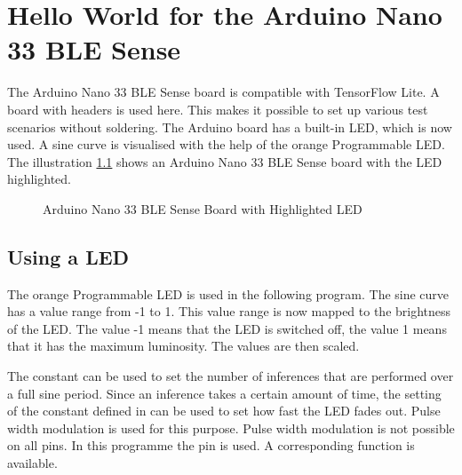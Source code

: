 %
%
%
%



\chapter{Hello World for the Arduino Nano 33 BLE Sense}

The Arduino Nano 33 BLE Sense board is compatible with TensorFlow Lite. A board with headers is used here. This makes it possible to set up various test scenarios without soldering. The Arduino board has a built-in LED, which is now used. A sine curve is visualised with the help of the orange Programmable LED. The illustration \ref{fig:NanoLED} shows an Arduino Nano 33 BLE Sense board with the LED highlighted.

\begin{figure}
  \centering
  
  \caption{Arduino Nano 33 BLE Sense Board with Highlighted LED}\label{fig:NanoLED}
\end{figure}


 \section{Using a LED}
 
 The orange Programmable LED is used in the following program. The sine curve has a value range from -1 to 1. This value range is now mapped to the brightness of the LED. The value -1 means that the LED is switched off, the value 1 means that it has the maximum luminosity. The values are then scaled. 

The constant  can be used to set the number of inferences that are performed over a full sine period. Since an inference takes a certain amount of time, the setting of the constant  defined in  can be used to set how fast the LED fades out. Pulse width modulation is used for this purpose. Pulse width modulation is not possible on all pins. In this programme the pin  is used. A corresponding function  is available.

